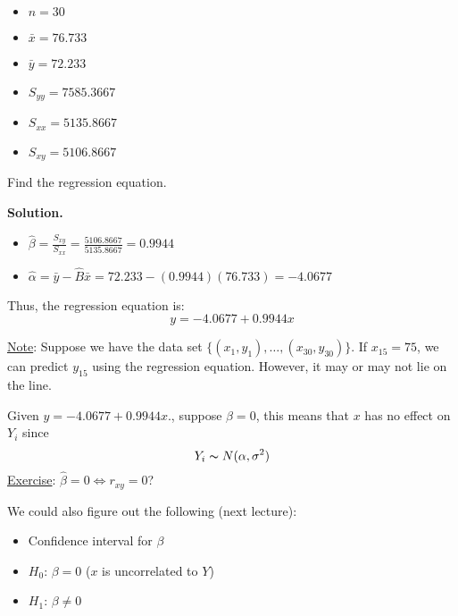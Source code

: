 \begin{exbox}
    \begin{example} $ \; $
        \begin{itemize}
            \item $ n=30 $
            \item $ \bar{x}=76.733 $
            \item $ \bar{y}=72.233 $
            \item $ S_{yy}=7585.3667 $
            \item $ S_{xx}=5135.8667 $
            \item $ S_{xy}=5106.8667 $
        \end{itemize}
        Find the regression equation.

        \textbf{Solution.}
        \begin{itemize}
            \item $ \hat{\beta}=\frac{S_{xy}}{S_{xx}}=\frac{5106.8667}{5135.8667}=0.9944 $
            \item $ \hat{\alpha}=\bar{y}-\hat{B}\bar{x}=72.233-(0.9944)(76.733)=-4.0677 $
        \end{itemize}
        Thus, the regression equation is:
        \[ y=-4.0677+0.9944x \]
    \end{example}
\end{exbox}
\underline{Note}: Suppose we have the data set $ \{(x_1,y_1),\ldots ,(x_{30},y_{30})\} $.
If $ x_{15}=75 $, we can predict $ y_{15} $ using the regression equation.
However, it may or may not lie on the line.

Given $ y=-4.0677+0.9944x  $., suppose $ \beta=0 $, this means that $ x $ has no effect on $ Y_i $ since
\[ Y_i \thicksim N(\alpha,\sigma^2) \]
\underline{Exercise}: $ \hat{\beta}=0\iff r_{xy}=0 $?

We could also figure out the following (next lecture):
\begin{itemize}
    \item Confidence interval for $ \beta $
    \item $ H_0 $: $ \beta=0 $ ($ x $ is uncorrelated to $ Y $)
    \item $ H_1 $: $ \beta\neq 0 $
\end{itemize}

